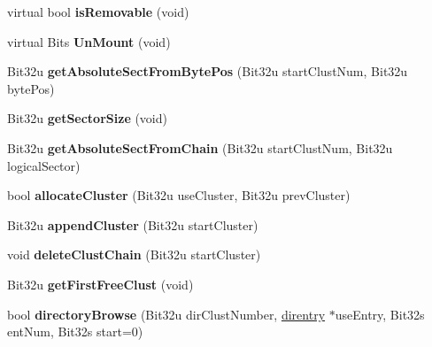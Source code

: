 \begin{DoxyCompactItemize}
\item 
\hypertarget{classfatDrive_a82f0f54ae1d64d62156b03c2f61f347f}{virtual bool {\bfseries is\-Removable} (void)}\label{classfatDrive_a82f0f54ae1d64d62156b03c2f61f347f}

\item 
\hypertarget{classfatDrive_ae4f1277e3b57d312737f2ece5785b2a9}{virtual Bits {\bfseries Un\-Mount} (void)}\label{classfatDrive_ae4f1277e3b57d312737f2ece5785b2a9}

\item 
\hypertarget{classfatDrive_ac865cd5b15f0a72a122783abdb9decbb}{Bit32u {\bfseries get\-Absolute\-Sect\-From\-Byte\-Pos} (Bit32u start\-Clust\-Num, Bit32u byte\-Pos)}\label{classfatDrive_ac865cd5b15f0a72a122783abdb9decbb}

\item 
\hypertarget{classfatDrive_ad2affae0064e689be43f4b081e8ae86b}{Bit32u {\bfseries get\-Sector\-Size} (void)}\label{classfatDrive_ad2affae0064e689be43f4b081e8ae86b}

\item 
\hypertarget{classfatDrive_ab31954a5996df17bbd27e17f4fbc26d6}{Bit32u {\bfseries get\-Absolute\-Sect\-From\-Chain} (Bit32u start\-Clust\-Num, Bit32u logical\-Sector)}\label{classfatDrive_ab31954a5996df17bbd27e17f4fbc26d6}

\item 
\hypertarget{classfatDrive_a77ee4b8cfb4e4fa3f3f63315c827c5aa}{bool {\bfseries allocate\-Cluster} (Bit32u use\-Cluster, Bit32u prev\-Cluster)}\label{classfatDrive_a77ee4b8cfb4e4fa3f3f63315c827c5aa}

\item 
\hypertarget{classfatDrive_a06109e670f9aea5c4dd11d07c50ae240}{Bit32u {\bfseries append\-Cluster} (Bit32u start\-Cluster)}\label{classfatDrive_a06109e670f9aea5c4dd11d07c50ae240}

\item 
\hypertarget{classfatDrive_a87019330262253fb796f8eec8ecccf5e}{void {\bfseries delete\-Clust\-Chain} (Bit32u start\-Cluster)}\label{classfatDrive_a87019330262253fb796f8eec8ecccf5e}

\item 
\hypertarget{classfatDrive_a629d48445667f2662cc360ccaef4b43e}{Bit32u {\bfseries get\-First\-Free\-Clust} (void)}\label{classfatDrive_a629d48445667f2662cc360ccaef4b43e}

\item 
\hypertarget{classfatDrive_accabf68f45861dba60d9c93981c816c4}{bool {\bfseries directory\-Browse} (Bit32u dir\-Clust\-Number, \hyperlink{structdirentry}{direntry} $\ast$use\-Entry, Bit32s ent\-Num, Bit32s start=0)}\label{classfatDrive_accabf68f45861dba60d9c93981c816c4}


\end{DoxyCompactItemize}
